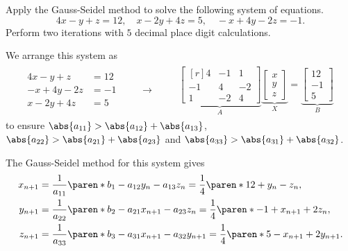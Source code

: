 \documentclass[11pt]{penrose}
\begin{document}
\begin{problem}{3}
    Apply the Gauss-Seidel method to solve the following system of equations.
    \begin{equation*}
        4x - y + z = 12,
        \quad
        x - 2y + 4z = 5,
        \quad
        -x + 4y - 2z = -1.
    \end{equation*}
    Perform two iterations with $5$ decimal place digit calculations.

    \solution We arrange this system as
    \begin{equation*}
    \begin{gathered}
    \begin{aligned}
        4x - y + z &= 12\\
        -x + 4y - 2z &= -1\\
        x - 2y + 4z &= 5
    \end{aligned}
    \qquad\to\qquad
    \begin{aligned}
        \underbrace{
        \begin{bmatrix*}[r]
            4 & -1 & 1 \\ -1 & 4 & -2 \\ 1 & -2 & 4
        \end{bmatrix*}
        }_{A}
        \underbrace{
        \begin{bmatrix}
            x \\ y \\ z
        \end{bmatrix}
        }_{X}
        =
        \underbrace{
        \begin{bmatrix}
            12 \\ -1 \\ 5
        \end{bmatrix}
        }_{B}
    \end{aligned}
    \end{gathered}
    \end{equation*}
    to ensure $\abs{a_{11}} > \abs{a_{12}} + \abs{a_{13}}$, $\abs{a_{22}} > \abs{a_{21}} + \abs{a_{23}}$ and $\abs{a_{33}} > \abs{a_{31}} + \abs{a_{32}}$.

    The Gauss-Seidel method for this system gives
    \begin{align*}
        x_{n+1} &= \frac{1}{a_{11}} \paren*{b_{1} - a_{12}y_{n} - a_{13}z_{n}} = \frac{1}{4} \paren*{12 + y_{n} - z_{n}},\\
        y_{n+1} &= \frac{1}{a_{22}} \paren*{b_{2} - a_{21}x_{n+1} - a_{23}z_{n}} = \frac{1}{4} \paren*{-1 + x_{n+1} + 2 z_{n}},\\
        z_{n+1} &= \frac{1}{a_{33}} \paren*{b_{3} - a_{31}x_{n+1} - a_{32}y_{n+1}} = \frac{1}{4} \paren*{5 - x_{n+1} + 2 y_{n+1}}.
    \end{align*}


\end{problem}
\end{document}
